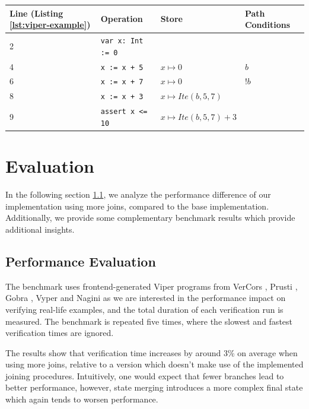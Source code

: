 \documentclass[11pt]{article}
\begin{document}
    \begin{center}
        \begin{tabular}{ l|l|l|l }
            Line (Listing \ref{lst:viper-example}) & Operation & Store & Path Conditions \\
            \hline
            2 & \texttt{var x: Int := 0} & & \\
            4 & \texttt{x := x + 5} & $x \mapsto 0$ & $b$ \\
            6 & \texttt{x := x + 7} & $x \mapsto 0$ & $!b$ \\
            8 & \texttt{x := x + 3} & $x \mapsto Ite(b, 5, 7)$ & \\
            9 & \texttt{assert x <= 10} & $x \mapsto Ite(b, 5, 7) + 3$ & \\
        \end{tabular}
        \label{execution-2}
    \end{center}

    \newpage
    \section{Evaluation}

    In the following section \ref{performance-evaluation}, we analyze the performance difference
    of our implementation using more joins, compared to the base implementation.
    Additionally, we provide some complementary benchmark results
    which provide additional insights. 


    \subsection{Performance Evaluation} \label{performance-evaluation}
    
    The benchmark uses frontend-generated Viper programs from VerCors \cite{vercors},
    Prusti \cite{prusti}, Gobra \cite{gobra}, Vyper \cite{vyper} and Nagini \cite{nagini}
    as we are interested in the performance impact on verifying real-life examples, and
    the total duration of each verification run is measured.
    The benchmark is repeated five times, where the
    slowest and fastest verification times are ignored.
    
    The results show that verification time
    increases by around 3\% on average when using more joins,
    relative to a version which doesn't
    make use of the implemented joining procedures.
    Intuitively, one would expect that fewer branches lead to better
    performance, however, state merging introduces a more complex final state which again tends to worsen
    performance.
\end{document}
